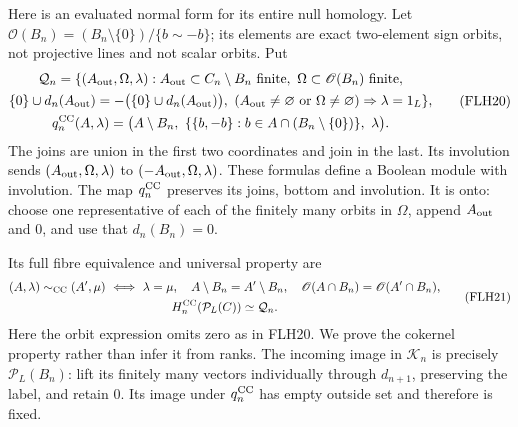 Here is an evaluated normal form for its entire null homology.
Let \(\mathscr O(B_n)=(B_n\setminus\{0\})/\{b\sim-b\}\);
its elements are exact two-element sign orbits, not projective
lines and not scalar orbits. Put
\[
\begin{gathered}
\mathcal Q_n=\{(A_{\rm out},\Omega,\lambda):
 A_{\rm out}\subset C_n\setminus B_n\text{ finite},\
 \Omega\subset\mathscr O(B_n)\text{ finite},\\
\{0\}\cup d_n(A_{\rm out})
        =-\bigl(\{0\}\cup d_n(A_{\rm out})\bigr),\
(A_{\rm out}\ne\varnothing\text{ or }\Omega\ne\varnothing)
                      \Rightarrow\lambda=1_L\},\\
q_n^{\rm CC}(A,\lambda)
 =\bigl(A\setminus B_n,\
       \{\{b,-b\}:b\in A\cap(B_n\setminus\{0\})\},\
       \lambda\bigr).
\end{gathered}\tag{FLH20}
\]
The joins are union in the first two coordinates and join
in the last. Its involution sends
\((A_{\rm out},\Omega,\lambda)\) to
\((-A_{\rm out},\Omega,\lambda)\).
These formulas define a Boolean module with involution.
The map \(q_n^{\rm CC}\) preserves its joins, bottom and
involution. It is onto: choose one representative of each
of the finitely many orbits in \(\Omega\), append \(A_{\rm out}\)
and \(0\), and use that \(d_n(B_n)=0\).

Its full fibre equivalence and universal property are
\[
\begin{gathered}
(A,\lambda)\sim_{\rm CC}(A',\mu)
\ \Longleftrightarrow\
\lambda=\mu,\quad A\setminus B_n=A'\setminus B_n,\quad
\mathscr O(A\cap B_n)=\mathscr O(A'\cap B_n),\\
H_n^{\rm CC}(\mathcal P_L(C))\simeq\mathcal Q_n.
\end{gathered}\tag{FLH21}
\]
Here the orbit expression omits zero as in FLH20.
We prove the cokernel property rather than infer it from ranks.
The incoming image in \(\mathcal K_n\) is precisely
\(\mathcal P_L(B_n)\): lift its finitely many vectors
individually through \(d_{n+1}\), preserving the label,
and retain \(0\). Its image under \(q_n^{\rm CC}\) has empty
outside set and therefore is fixed.

